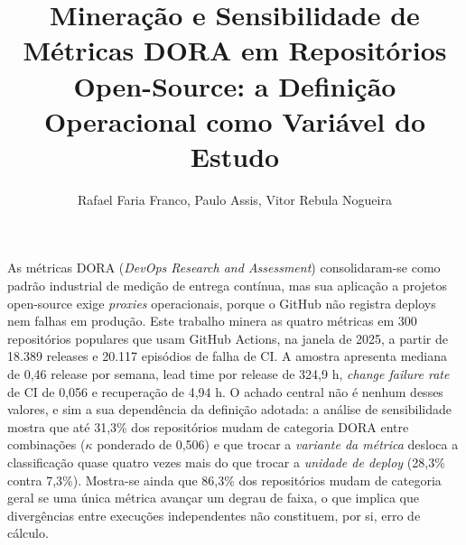 \documentclass[12pt]{article}
\title{Mineração e Sensibilidade de Métricas DORA em Repositórios\\
       Open-Source: a Definição Operacional como Variável do Estudo}
\author{Rafael Faria Franco\inst{1}, Paulo Assis\inst{1}, Vitor Rebula Nogueira\inst{1}}
\begin{document}
\maketitle

\begin{resumo}
As métricas DORA (\emph{DevOps Research and Assessment}) consolidaram-se como padrão
industrial de medição de entrega contínua, mas sua aplicação a projetos open-source exige
\emph{proxies} operacionais, porque o GitHub não registra deploys nem falhas em produção.
Este trabalho minera as quatro métricas em 300 repositórios populares que usam GitHub
Actions, na janela de 2025, a partir de 18.389 releases e 20.117 episódios de falha de CI.
A amostra apresenta mediana de 0,46 release por semana, lead time por release de 324,9 h,
\emph{change failure rate} de CI de 0,056 e recuperação de 4,94 h. O achado central não é
nenhum desses valores, e sim a sua dependência da definição adotada: a análise de
sensibilidade mostra que até 31,3\% dos repositórios mudam de categoria DORA entre
combinações ($\kappa$ ponderado de 0,506) e que trocar a \emph{variante da métrica} desloca
a classificação quase quatro vezes mais do que trocar a \emph{unidade de deploy}
(28,3\% contra 7,3\%). Mostra-se ainda que 86,3\% dos repositórios mudam de categoria geral
se uma única métrica avançar um degrau de faixa, o que implica que divergências entre
execuções independentes não constituem, por si, erro de cálculo.
\end{resumo}








\end{document}
